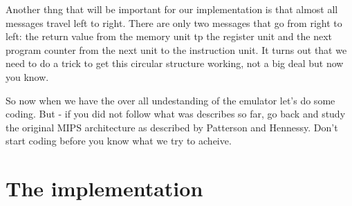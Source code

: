 \documentclass[a4paper,11pt]{article}
\begin{document}
Another thng that will be important for our implementation is that
almost all messages travel left to right. There are only two messages
that go from right to left: the return value from the memory unit tp
the register unit and the next program counter from the next unit to
the instruction unit. It turns out that we need to do a trick to get
this circular structure working, not a big deal but now you know.

So now when we have the over all undestanding of the emulator let's do
some coding. But - if you did not follow what was describes so far, go
back and study the original MIPS architecture as described by
Patterson and Hennessy. Don't start coding before you know what we try
to acheive.

\section{The implementation}
\end{document}
